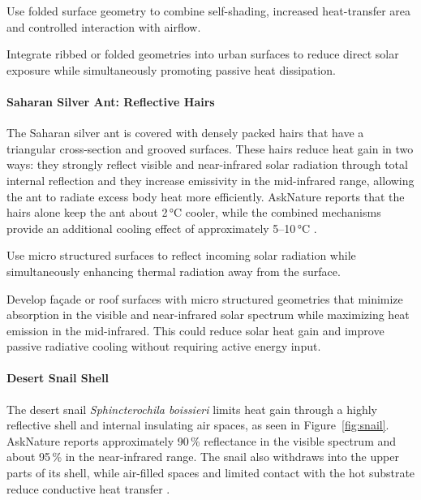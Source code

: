  Use folded surface geometry to combine self-shading,
increased heat-transfer area and controlled interaction with airflow.

 Integrate ribbed or folded geometries into
urban surfaces to reduce direct solar exposure while simultaneously promoting passive
heat dissipation.


\clearpage

\paragraph{Saharan Silver Ant: Reflective Hairs}
\label{sec:model_ant}

The Saharan silver ant is covered with densely packed hairs that have a triangular
cross-section and grooved surfaces. These hairs reduce heat gain in two ways: they
strongly reflect visible and near-infrared solar radiation through total internal
reflection and they increase emissivity in the mid-infrared range, allowing the ant to
radiate excess body heat more efficiently. AskNature reports that the hairs alone keep
the ant about 2\,°C cooler, while the combined mechanisms provide an additional cooling
effect of approximately 5--10\,°C \cite{asknature_anthair}.

 Use micro structured surfaces to reflect incoming solar
radiation while simultaneously enhancing thermal radiation away from the surface.

 Develop façade or roof surfaces with micro
structured geometries that minimize absorption in the visible and near-infrared solar
spectrum while maximizing heat emission in the mid-infrared. This could reduce solar heat
gain and improve passive radiative cooling without requiring active energy input.


\paragraph{Desert Snail Shell}
\label{sec:model_snail}

The desert snail \emph{Sphincterochila boissieri} limits heat gain through a highly
reflective shell and internal insulating air spaces, as seen in Figure~\ref{fig:snail}.
AskNature reports approximately 90\,\% reflectance in the visible spectrum and about
95\,\% in the near-infrared range. The snail also withdraws into the upper parts of its
shell, while air-filled spaces and limited contact with the hot substrate reduce
conductive heat transfer \cite{asknature_snail}.

